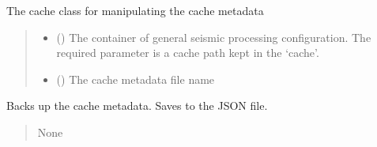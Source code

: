 \documentclass[letterpaper,10pt,english]{sphinxmanual}
\begin{document}
\begin{fulllineitems}
\label{\detokenize{api_core:core.signal_utils.Cache}}
\pysigstartsignatures
{}
\pysigstopsignatures
\sphinxAtStartPar
The cache class for manipulating the cache metadata
\begin{quote}\begin{description}
\begin{itemize}
\item {} 
\sphinxAtStartPar
{} () \textendash{} The container of general seismic processing configuration.
The required parameter is a cache path kept in the ‘cache’.

\item {} 
\sphinxAtStartPar
{} () \textendash{} The cache metadata file name

\end{itemize}

\end{description}\end{quote}

\begin{fulllineitems}
\label{\detokenize{api_core:core.signal_utils.Cache.backup}}
\pysigstartsignatures
{}
\pysigstopsignatures
\sphinxAtStartPar
Backs up the cache metadata. Saves to the JSON file.
\begin{quote}\begin{description}
\sphinxAtStartPar
None

\end{description}\end{quote}

\end{fulllineitems}


\end{fulllineitems}

\end{document}
